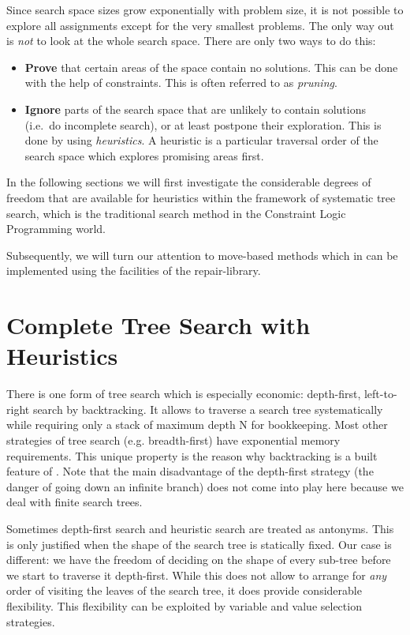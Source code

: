 Since search space sizes grow exponentially with problem size,
it is not possible to explore all assignments except for the
very smallest problems.
The only way out is {\em not} to look at the whole search space.
There are only two ways to do this:
\begin{itemize}
\item {\bf Prove} that certain areas of the space contain no solutions.
    This can be done with the help of constraints. This is often referred
    to as {\em pruning}.
\item {\bf Ignore} parts of the search space that are unlikely to contain
    solutions (i.e.\ do incomplete search), or at least postpone their exploration.
    This is done by using {\em heuristics}.
    A heuristic is a particular traversal order of the search space
    which explores promising areas first.
\end{itemize}

In the following sections we will first investigate the considerable
degrees of freedom that are available for heuristics within the framework of
systematic tree search, which is the traditional search method
in the Constraint Logic Programming world.

Subsequently, we will turn our attention to move-based methods
which in {\eclipse} can be implemented using the facilities of the repair-library.


\section{Complete Tree Search with Heuristics}

There is one form of tree search which is especially economic: 
depth-first, left-to-right search by backtracking.  It allows to
traverse a search tree systematically while requiring only a stack
of maximum depth N for bookkeeping.  Most other strategies of tree
search (e.g.  breadth-first) have exponential memory requirements. 
This unique property is the reason why backtracking is a built feature
of {\eclipse}.  Note that the main disadvantage of the depth-first
strategy (the danger of going down an infinite branch) does not come
into play here because we deal with finite search trees.

Sometimes depth-first search and heuristic search are treated as antonyms.
This is only justified when the shape of the search tree is statically fixed.
Our case is different: we have the freedom of deciding on the shape of every
sub-tree before we start to traverse it depth-first. While this does not
allow to arrange for {\em any} order of visiting the leaves of the search tree,
it does provide considerable flexibility. This flexibility can be exploited
by variable and value selection strategies.

